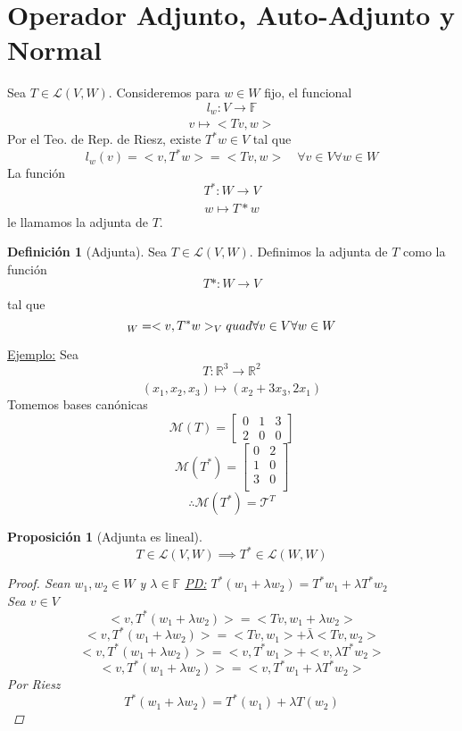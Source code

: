 \documentclass[11pt]{book}
\newcommand{\set}[1]{\mathbb{#1}}
\newcommand{\func}[5]{#1:#2\xrightarrow[#5]{#4}#3}
\newtheorem{prop}[thm]{Proposición}
\theoremstyle{definition}
\newtheorem{defn}{Definición}[section]
\begin{document}
\section{Operador Adjunto, Auto-Adjunto y Normal}
Sea $T\in\mathcal{L}(V,W)$. Consideremos para $w\in W$ fijo, el funcional
\[\func{l_w}{V}{\set{F}}{}{}\]
\[v\mapsto <Tv,w>\]
Por el Teo. de Rep. de Riesz, existe $T^*w\in V$ tal que
\[l_w(v)=<v,T^*w>=<Tv,w>\quad\forall v\in V\forall w\in W\]
La función
\[\func{T^*}{W}{V}{}{}\]
\[w\mapsto T*w\]
le llamamos la adjunta de $T$.
\begin{defn}[Adjunta]
	Sea $T\in\mathcal{L}(V,W)$. Definimos la adjunta de $T$ como la función
	\[\func{T*}{W}{V}{}{}\]
	tal que 
	\[<Tv,w>_W=<v,T^*w>_V\\quad\forall v\in V\forall w\in W\]
\end{defn}
\underline{Ejemplo:} Sea
\[\func{T}{\set{R}^3}{\set{R}^2}{}{}\]
\[(x_1,x_2,x_3)\mapsto (x_2+3x_3,2x_1)\]
Tomemos bases canónicas
\[\mathcal{M}(T)=\begin{bmatrix}
	0 & 1 & 3\\
	2 & 0 & 0
\end{bmatrix}\]
\[\mathcal{M}(T^*)=\begin{bmatrix}
	0 & 2\\
	1 & 0\\
	3 & 0\\
\end{bmatrix}\]
\[\therefore \mathcal{M}(T^*)=\mathcal{T}^T\]
\begin{prop}[Adjunta es lineal]
	\[T\in\mathcal{L}(V,W)\implies T^*\in\mathcal{L}(W,W)\]
	\begin{proof}
		Sean $w_1,w_2\in W$ y $\lambda\in\set{F}$
		\underline{PD:} $T^*(w_1+\lambda w_2)=T^*w_1+\lambda T^*w_2$\\
		Sea $v\in V$
		\[<v,T^*(w_1+\lambda w_2)>=<Tv,w_1+\lambda w_2>\]
		\[<v,T^*(w_1+\lambda w_2)>=<Tv,w_1>+\bar{\lambda}<Tv,w_2>\]
		\[<v,T^*(w_1+\lambda w_2)>=<v,T^*w_1>+<v,\lambda T^*w_2>\]
		\[<v,T^*(w_1+\lambda w_2)>=<v,T^*w_1+\lambda T^*w_2>\]
		Por Riesz
		\[T^*(w_1+\lambda w_2)=T^*(w_1)+\lambda T(w_2)\]
	\end{proof}
\end{prop}
\end{document}
